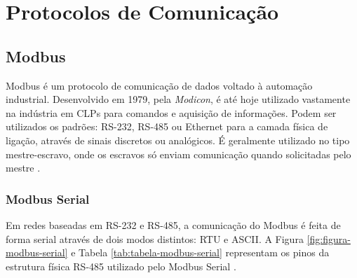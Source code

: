         \begin{figure}[!h]
	    \end{figure}

    \section{Protocolos de Comunicação}
    \label{sec:protocolos}
    
    \subsection{Modbus}
    \label{sec:modbus}
    
    Modbus é um protocolo de comunicação de dados voltado à automação industrial. Desenvolvido em 1979, pela \textit{Modicon}, é até hoje utilizado vastamente na indústria em \glspl{CLP} para comandos e aquisição de informações. Podem ser utilizados os padrões: RS-232, RS-485 ou Ethernet para a camada física de ligação, através de sinais discretos ou analógicos. É geralmente utilizado no tipo mestre-escravo, onde os escravos só enviam comunicação quando solicitadas pelo mestre  \cite{Modbus}.
    
    \subsubsection{Modbus Serial}
    \label{sec:modbus-serial}

        Em redes baseadas em RS-232 e RS-485, a comunicação do Modbus é feita de forma serial através de dois modos distintos: \gls{RTU} e \gls{ASCII}. A Figura \ref{fig:figura-modbus-serial} e Tabela \ref{tab:tabela-modbus-serial} representam os pinos da estrutura física RS-485 utilizado pelo Modbus Serial \cite{Modbus}.
        
